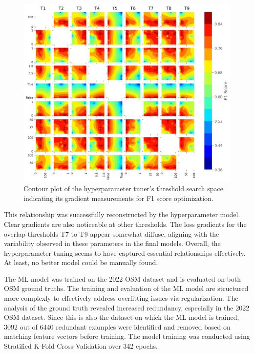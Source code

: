 \begin{figure}[t]
\centering 
\includegraphics[width=\linewidth]{images/matching-hpt-contour-topological-osm-updated.png}
\caption{Contour plot of the hyperparameter tuner's threshold search space indicating its gradient measurements for F1 score optimization.}
\label{fig:hyperparameter-contourplot}
\end{figure}

This relationship was successfully reconstructed by the hyperparameter model. Clear gradients are also noticeable at other thresholds. The loss gradients for the overlap thresholds T7 to T9 appear somewhat diffuse, aligning with the variability observed in these parameters in the final models. Overall, the hyperparameter tuning seems to have captured essential relationships effectively. At least, no better model could be manually found.

The ML model was trained on the 2022 OSM dataset and is evaluated on both OSM ground truths. The training and evaluation of the ML model are structured more complexly to effectively address overfitting issues via regularization. The analysis of the ground truth revealed increased redundancy, especially in the 2022 OSM dataset. Since this is also the dataset on which the ML model is trained, 3092 out of 6440 redundant examples were identified and removed based on matching feature vectors before training. The model training was conducted using Stratified K-Fold Cross-Validation over 342 epochs.

